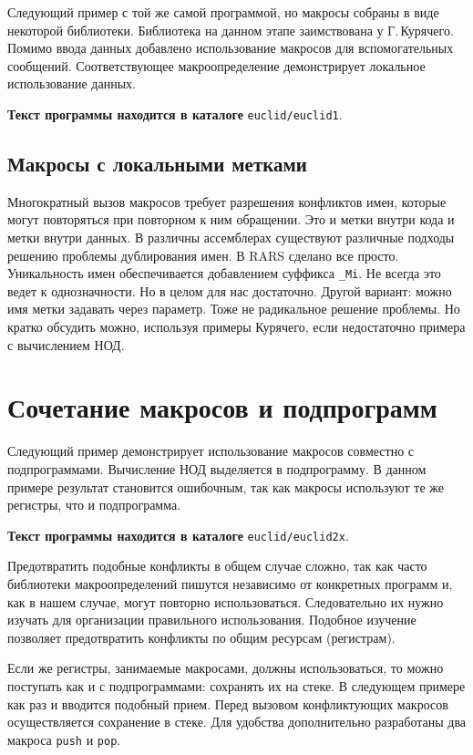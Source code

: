 Следующий пример с той же самой программой, но макросы собраны в виде некоторой библиотеки. Библиотека на данном этапе заимствована у Г.\,Курячего. Помимо ввода данных добавлено использование макросов для вспомогательных сообщений. Соответствующее макроопределение демонстрирует локальное использование данных.

\textbf{Текст программы находится в каталоге} \verb|euclid/euclid1|.

\subsection{Макросы с локальными метками}

Многократный вызов макросов требует разрешения конфликтов имен, которые могут повторяться при повторном к ним обращении. Это и метки внутри кода и метки внутри данных. В различны ассемблерах существуют различные подходы решению проблемы дублирования имен. В RARS сделано все просто. Уникальность имен обеспечивается добавлением суффикса \verb|_Mi|. Не всегда это ведет к однозначности. Но в целом для нас достаточно. Другой вариант: можно имя метки задавать через параметр. Тоже не радикальное решение проблемы. Но кратко обсудить можно, используя примеры Курячего, если недостаточно примера с вычислением НОД.

\section{Сочетание макросов и подпрограмм}

Следующий пример демонстрирует использование макросов совместно с подпрограммами. Вычисление НОД выделяется в подпрограмму. В данном примере результат становится ошибочным, так как макросы используют те же регистры, что и подпрограмма.

\textbf{Текст программы находится в каталоге} \verb|euclid/euclid2x|.

Предотвратить подобные конфликты в общем случае сложно, так как часто библиотеки макроопределений пишутся независимо от конкретных программ и, как в нашем случае, могут повторно использоваться. Следовательно их нужно изучать для организации правильного использования. Подобное изучение позволяет предотвратить конфликты по общим ресурсам (регистрам).

Если же регистры, занимаемые макросами, должны использоваться, то можно поступать как и с подпрограммами: сохранять их на стеке. В следующем примере как раз и вводится подобный прием. Перед вызовом конфликтующих макросов осуществляется сохранение в стеке. Для удобства дополнительно разработаны два макроса \verb|push| и \verb|pop|.

